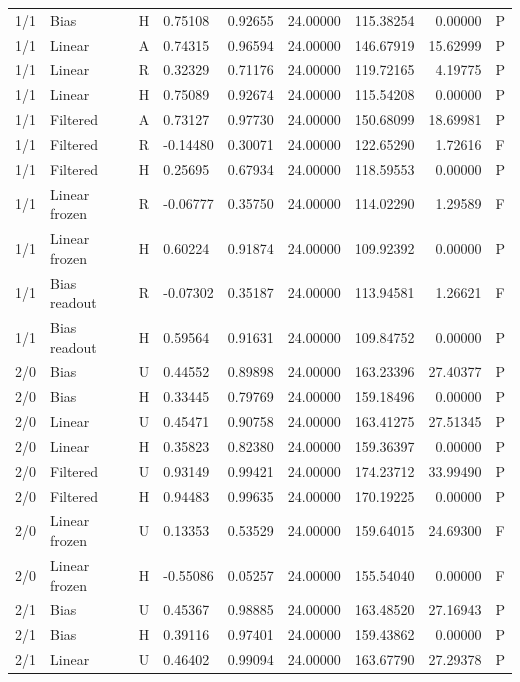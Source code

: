 \begin{longtable}{rlllrrrrl}
1/1 & Bias & H & 0.75108 & 0.92655 & 24.00000 & 115.38254 & 0.00000 & P \\
1/1 & Linear & A & 0.74315 & 0.96594 & 24.00000 & 146.67919 & 15.62999 & P \\
1/1 & Linear & R & 0.32329 & 0.71176 & 24.00000 & 119.72165 & 4.19775 & P \\
1/1 & Linear & H & 0.75089 & 0.92674 & 24.00000 & 115.54208 & 0.00000 & P \\
1/1 & Filtered & A & 0.73127 & 0.97730 & 24.00000 & 150.68099 & 18.69981 & P \\
1/1 & Filtered & R & -0.14480 & 0.30071 & 24.00000 & 122.65290 & 1.72616 & F \\
1/1 & Filtered & H & 0.25695 & 0.67934 & 24.00000 & 118.59553 & 0.00000 & P \\
1/1 & Linear frozen & R & -0.06777 & 0.35750 & 24.00000 & 114.02290 & 1.29589 & F \\
1/1 & Linear frozen & H & 0.60224 & 0.91874 & 24.00000 & 109.92392 & 0.00000 & P \\
1/1 & Bias readout & R & -0.07302 & 0.35187 & 24.00000 & 113.94581 & 1.26621 & F \\
1/1 & Bias readout & H & 0.59564 & 0.91631 & 24.00000 & 109.84752 & 0.00000 & P \\
2/0 & Bias & U & 0.44552 & 0.89898 & 24.00000 & 163.23396 & 27.40377 & P \\
2/0 & Bias & H & 0.33445 & 0.79769 & 24.00000 & 159.18496 & 0.00000 & P \\
2/0 & Linear & U & 0.45471 & 0.90758 & 24.00000 & 163.41275 & 27.51345 & P \\
2/0 & Linear & H & 0.35823 & 0.82380 & 24.00000 & 159.36397 & 0.00000 & P \\
2/0 & Filtered & U & 0.93149 & 0.99421 & 24.00000 & 174.23712 & 33.99490 & P \\
2/0 & Filtered & H & 0.94483 & 0.99635 & 24.00000 & 170.19225 & 0.00000 & P \\
2/0 & Linear frozen & U & 0.13353 & 0.53529 & 24.00000 & 159.64015 & 24.69300 & F \\
2/0 & Linear frozen & H & -0.55086 & 0.05257 & 24.00000 & 155.54040 & 0.00000 & F \\
2/1 & Bias & U & 0.45367 & 0.98885 & 24.00000 & 163.48520 & 27.16943 & P \\
2/1 & Bias & H & 0.39116 & 0.97401 & 24.00000 & 159.43862 & 0.00000 & P \\
2/1 & Linear & U & 0.46402 & 0.99094 & 24.00000 & 163.67790 & 27.29378 & P \\

\end{longtable}
